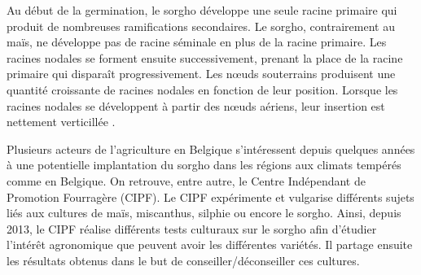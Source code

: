 Au début de la germination, le sorgho développe une seule racine primaire qui produit de nombreuses ramifications secondaires.
Le sorgho, contrairement au maïs, ne développe pas de racine séminale en plus de la racine primaire.
Les racines nodales se forment ensuite successivement, prenant la place de la racine primaire qui disparaît progressivement.
Les nœuds souterrains produisent une quantité croissante de racines nodales en fonction de leur position.
Lorsque les racines nodales se développent à partir des nœuds aériens, leur insertion est nettement verticillée \citep{kumar_goyal_how_2021}.
\newline

Plusieurs acteurs de l'agriculture en Belgique s'intéressent depuis quelques années à une potentielle implantation du sorgho dans les régions aux climats tempérés comme en Belgique.
On retrouve, entre autre, le Centre Indépendant de Promotion Fourragère (CIPF).
Le CIPF expérimente et vulgarise différents sujets liés aux cultures de maïs, miscanthus, silphie ou encore le sorgho.
Ainsi, depuis 2013, le CIPF réalise différents tests culturaux sur le sorgho afin d'étudier l'intérêt agronomique que peuvent avoir les différentes variétés.
Il partage ensuite les résultats obtenus dans le but de conseiller/déconseiller ces cultures.